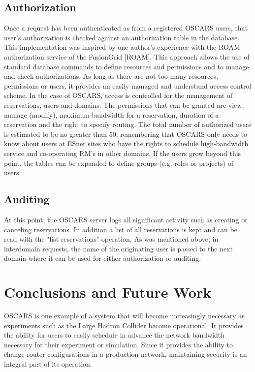 \documentclass[conference]{IEEEtran}
\begin{document}
\subsection{Authorization}
Once a request has been authenticated as from a registered OSCARS
users, that user's authorization is checked against an authorization
table in the database. This implementation was inspired by one
author's experience with the ROAM authorization service of the
FusionGrid [ROAM]. This approach allows the use of standard database
commands to define resources and permissions and to manage and check
authorizations. As long as there are not too many resources,
permissions or users, it provides an easily managed and understand
access control scheme. In the case of OSCARS,  access  is controlled for 
the management of reservations, users and domains. The permissions that can
be granted are view, manage (modify), maximum-bandwidth for a
reservation, duration of a reservation and the right to specify
routing.  The total number of authorized users is estimated to
be no greater than 50, remembering that OSCARS only needs to know
about users at ESnet sites who have the rights to schedule
high-bandwidth service and co-operating RM's in other
domains. If the users grow beyond this point, the tables can be
expanded to define groups (e.g. roles or projects) of users.

\subsection{Auditing}
At this point, the OSCARS server logs all significant activity such as
creating or canceling reservations. In addition a list of all
reservations is kept and can be read with the "list reservations"
operation. As was mentioned above, in interdomain requests, the name
of the originating user is passed to the next domain where it can be
used for either authorization or auditing.


\section{Conclusions and Future Work}

OSCARS is one example of a system that will become increasingly necessary
as experiments such as the Large Hadron Collider become operational.  It
provides the ability for users to easily schedule in advance the 
network bandwidth necessary for their experiment or simulation.  Since it
provides the ability to change router configurations in a production network,
maintaining security is an integral part of its operation.
\end{document}

